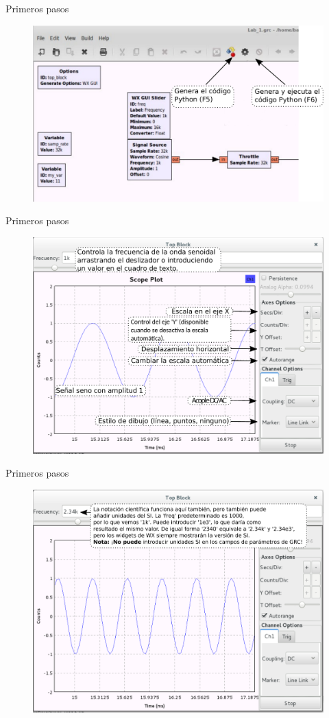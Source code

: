 \begin{frame}{Primeros pasos}
\begin{figure}[H]
\centering
\includegraphics[width=\textwidth]{lab1/pdf/lab1_18.pdf}
\end{figure}
\end{frame}

\begin{frame}{Primeros pasos}
\begin{figure}[H]
\centering
\includegraphics[width=\textwidth, height=0.55\textwidth]{lab1/pdf/lab1_19.pdf}
\end{figure}
\end{frame}

\begin{frame}{Primeros pasos}
\begin{figure}[H]
\centering
\includegraphics[width=\textwidth, height=0.55\textwidth]{lab1/pdf/lab1_20.pdf}
\end{figure}
\end{frame}

